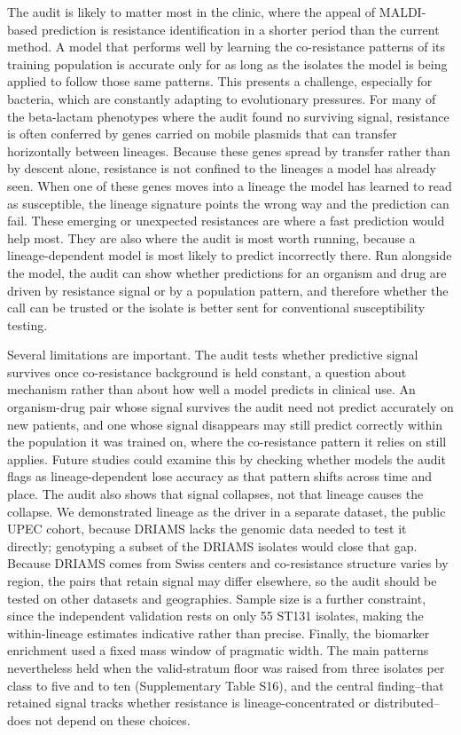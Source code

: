 \documentclass[11pt]{article}
\begin{document}
The audit is likely to matter most in the clinic, where the appeal of MALDI-based prediction is resistance identification in a shorter period than the current method. A model that performs well by learning the co-resistance patterns of its training population is accurate only for as long as the isolates the model is being applied to follow those same patterns. This presents a challenge, especially for bacteria, which are constantly adapting to evolutionary pressures. For many of the beta-lactam phenotypes where the audit found no surviving signal, resistance is often conferred by genes carried on mobile plasmids that can transfer horizontally between lineages. Because these genes spread by transfer rather than by descent alone, resistance is not confined to the lineages a model has already seen. When one of these genes moves into a lineage the model has learned to read as susceptible, the lineage signature points the wrong way and the prediction can fail. These emerging or unexpected resistances are where a fast prediction would help most. They are also where the audit is most worth running, because a lineage-dependent model is most likely to predict incorrectly there. Run alongside the model, the audit can show whether predictions for an organism and drug are driven by resistance signal or by a population pattern, and therefore whether the call can be trusted or the isolate is better sent for conventional susceptibility testing.

Several limitations are important. The audit tests whether predictive signal survives once co-resistance background is held constant, a question about mechanism rather than about how well a model predicts in clinical use. An organism-drug pair whose signal survives the audit need not predict accurately on new patients, and one whose signal disappears may still predict correctly within the population it was trained on, where the co-resistance pattern it relies on still applies. Future studies could examine this by checking whether models the audit flags as lineage-dependent lose accuracy as that pattern shifts across time and place. The audit also shows that signal collapses, not that lineage causes the collapse. We demonstrated lineage as the driver in a separate dataset, the public UPEC cohort, because DRIAMS lacks the genomic data needed to test it directly; genotyping a subset of the DRIAMS isolates would close that gap. Because DRIAMS comes from Swiss centers and co-resistance structure varies by region, the pairs that retain signal may differ elsewhere, so the audit should be tested on other datasets and geographies. Sample size is a further constraint, since the independent validation rests on only 55 ST131 isolates, making the within-lineage estimates indicative rather than precise. Finally, the biomarker enrichment used a fixed mass window of pragmatic width. The main patterns nevertheless held when the valid-stratum floor was raised from three isolates per class to five and to ten (Supplementary Table S16), and the central finding--that retained signal tracks whether resistance is lineage-concentrated or distributed--does not depend on these choices.
\end{document}
